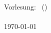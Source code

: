 
\parindent 0pt
\parskip 12pt



\pagestyle{empty}

\newcommand{\header}{Vorlesung: \vorlesung \hfill  \autor \, (\matrikelnummer)\\ \zettel \hfill \gruppe \\ \today}

\header


